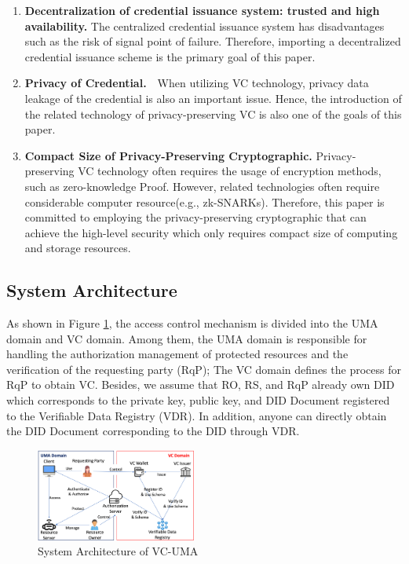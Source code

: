 \documentclass[conference, dvipdfmx]{IEEEtran} %
\begin{document}
\begin{sloppypar}
\begin{enumerate}
  \item \textbf{Decentralization of credential issuance system: trusted and high availability.} The centralized credential issuance system has disadvantages such as the risk of signal point of failure. Therefore, importing a decentralized credential issuance scheme is the primary goal of this paper.
  \item \textbf{Privacy of Credential.}　When utilizing VC technology, privacy data leakage of the credential is also an important issue. Hence, the introduction of the related technology of privacy-preserving VC is also one of the goals of this paper.
  \item \textbf{Compact Size of Privacy-Preserving Cryptographic.} Privacy-preserving VC technology often requires the usage of encryption methods, such as zero-knowledge Proof. However, related technologies often require considerable computer resource(e.g., zk-SNARKs). Therefore, this paper is committed to employing the privacy-preserving cryptographic that can achieve the high-level security which only requires compact size of computing and storage resources.
\end{enumerate}

\subsection{System Architecture}

As shown in Figure \ref{fig:system_architecture}, the access control mechanism is divided into the UMA domain and VC domain. Among them, the UMA domain is responsible for handling the authorization management of protected resources and the verification of the requesting party (RqP);
The VC domain defines the process for RqP to obtain VC. Besides, we assume that RO, RS, and RqP already own DID which corresponds to the private key, public key, and DID Document registered to the Verifiable Data Registry (VDR). In addition, anyone can directly obtain the DID Document corresponding to the DID through VDR.


\begin{figure}[htbp] %
  \begin{center} %
  \includegraphics[width=0.47\textwidth]{images/structure_vc_uma.png} %
  \caption{System Architecture of VC-UMA} %
  \label{fig:system_architecture} %
  \end{center}
\end{figure}


\end{sloppypar}
\end{document}
